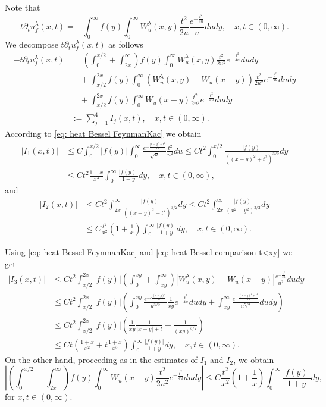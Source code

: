 \documentclass[a4paper,10pt, reqno]{amsart}
\theoremstyle{definition}
\theoremstyle{remark}
\numberwithin{equation}{section}
\begin{document}
Note that
\[
t\partial_t u_f^\lambda (x,t)=-\int_0^\infty f(y)\int_0^\infty W_u^\lambda (x,y)\frac{t^2}{2u}\frac{e^{-\frac{t^2}{4u}}}{u}dudy,\quad x,t\in (0,\infty).
\]
We decompose $t\partial_t u_f^\lambda (x,t)$ as follows
\begin{align}\label{P1}
    -t\partial_t u_f^\lambda (x,t)&=\left(\int_0^{x/2}+\int_{2x}^\infty \right)f(y)\int_0^\infty W_u^\lambda (x,y)\frac{t^2}{2u^2}e^{-\frac{t^2}{4u}}dudy\nonumber\\
    &\quad +\int_{x/2}^{2x}f(y)\int_0^ \infty (W_u^\lambda (x,y)-W_u(x-y))\frac{t^2}{2u^2}e^{-\frac{t^2}{4u}}dudy\nonumber\\
    &\quad +\int_{x/2}^{2x}f(y)\int_0^ \infty W_u(x-y)\frac{t^2}{2u^2}e^{-\frac{t^2}{4u}}dudy\nonumber\\
    &:=\sum_{j=1}^4I_j(x,t),\quad x,t\in (0,\infty).
\end{align}
According to \eqref{eq: heat Bessel FeynmanKac} we obtain
\begin{align}\label{P2}
|I_1(x,t)|&\leq C\int_0^{x/2}|f(y)|\int_0^\infty \frac{e^{-\frac{|x-y|^2+t^2}{4u}}}{\sqrt{u}}\frac{t^2}{u^2}du\leq Ct^2\int_0^{x/2}\frac{|f(y)|}{((x-y)^2+t^2)^{3/2}}dy\nonumber\\
&\leq Ct^2\frac{1+x}{x^3}\int_0^\infty \frac{|f(y)|}{1+y}dy,\quad x,t\in (0,\infty),
\end{align}
and
\begin{align}\label{P3}
|I_2(x,t)|&\leq Ct^2\int_{2x}^\infty \frac{|f(y)|}{((x-y)^2+t^2)^{3/2}}dy\leq Ct^2\int_{2x}^\infty \frac{|f(y)|}{(x^2+y^2)^{3/2}}dy\nonumber\\
&\leq C\frac{t^2}{x^2}\left(1+\frac{1}{x}\right)\int_0^\infty \frac{|f(y)|}{1+y}dy,\quad  x,t\in (0,\infty).
\end{align}

Using \eqref{eq: heat Bessel FeynmanKac} and \eqref{eq: heat Bessel comparison t<xy} we get
\begin{align}\label{P4}
|I_3(x,t)|&\leq Ct^2\int_{x/2}^{2x}|f(y)|\left(\int_0^{xy}+\int_{xy}^\infty \right) |W_u^\lambda (x,y)-W_u(x-y)|\frac{e^{-\frac{t^2}{4u}}}{u^2}dudy\nonumber\\
&\leq Ct^2\int_{x/2}^{2x}|f(y)|\left(\int_0^{xy}\frac{e^{-c\frac{(x-y)^2}{u}}}{u^{3/2}}\frac{1}{xy}e^{-\frac{t^2}{4u}}dudy+\int_{xy}^\infty \frac{e^{-\frac{(x-y)^2+t^2}{4u}}}{u^{5/2}}dudy\right)\nonumber\\
&\leq Ct^2\int_{x/2}^{2x}|f(y)|\left(\frac{1}{xy}\frac{1}{|x-y|+t}+\frac{1}{(xy)^{3/2}}\right)\nonumber\\
&\leq Ct\left(\frac{1+x}{x^2}+t\frac{1+x}{x^3}\right)\int_0^\infty\frac{|f(y)|}{1+y}dy,\quad x,t\in (0,\infty).
\end{align}
On the other hand, proceeding as in the estimates of $I_1$ and $I_2$, we obtain
\begin{equation}\label{P5}
\left|\left(\int_0^{x/2}+\int_{2x}^\infty \right)f(y)\int_0^\infty W_u(x-y)\frac{t^2}{2u^2}e^{-\frac{t^2}{4u}}dudy\right|\leq C\frac{t^2}{x^2}\left(1+\frac{1}{x}\right)\int_0^\infty \frac{|f(y)|}{1+y}dy,
\end{equation}
for $x,t\in (0,\infty)$.
\end{document}
